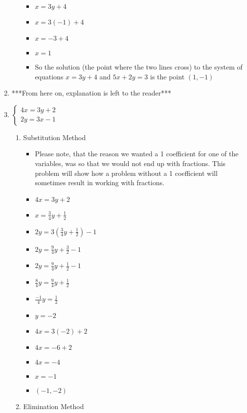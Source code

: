 \documentclass{article}
\begin{document}
\begin{enumerate}
\begin{enumerate}
\begin{itemize}
    \item []  $x=3y+4$
    \item []  $x=3(-1)+4$
    \item []  $x=-3+4$
    \item []  $x=1$
    \item So the solution (the point where the two lines cross) to the system of equations $x=3y+4$ and $5x+2y=3$ is the point $(1,-1)$
    \end{itemize}
  \end{enumerate}
\item [] ***From here on, explanation is left to the reader***
\item $\left\{ \begin{array}{l}
      4x=3y+2 \\
      2y=3x-1 \end{array} \right.$
  \begin{enumerate}
  \item Substitution Method
    \begin{itemize}
    \item Please note, that the reason we wanted a 1 coefficient for one of the variables, was so that we would not end up with fractions. This problem will show how a problem without a 1 coefficient will sometimes result in working with fractions.
    \item $4x=3y+2$
    \item {\Large $x=\frac{3}{4}y+\frac{1}{2}$}
    \item {\Large $2y=3\left(\frac{3}{4}y+\frac{1}{2}\right)-1$}
    \item {\Large $2y=\frac{9}{4}y+\frac{3}{2}-1$}
    \item {\Large $2y=\frac{9}{4}y+\frac{1}{2}-1$}
    \item {\Large $\frac{8}{4}y=\frac{9}{4}y+\frac{1}{2}$}
    \item {\Large $\frac{-1}{4}y=\frac{1}{2}$}
    \item $y=-2$
    \item $4x=3(-2)+2$
    \item $4x=-6+2$
    \item $4x=-4$
    \item $x=-1$
    \item $(-1,-2)$
    \end{itemize}
  \item Elimination Method
\end{enumerate}
\end{enumerate}
\end{document}
